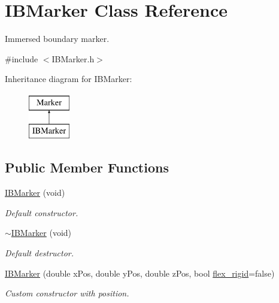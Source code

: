 \hypertarget{class_i_b_marker}{}\section{I\+B\+Marker Class Reference}
\label{class_i_b_marker}


Immersed boundary marker.  




{\ttfamily \#include $<$I\+B\+Marker.\+h$>$}

Inheritance diagram for I\+B\+Marker\+:\begin{figure}[H]
\begin{center}
\leavevmode
\includegraphics[height=2.000000cm]{class_i_b_marker}
\end{center}
\end{figure}
\subsection*{Public Member Functions}
\begin{DoxyCompactItemize}
\item 
\hyperlink{class_i_b_marker_ab45e9679ae96b75ab7655e738807bb41}{I\+B\+Marker} (void)
\begin{DoxyCompactList}\small\item\em Default constructor. \end{DoxyCompactList}\item 
\hyperlink{class_i_b_marker_a0f3e177c42c3d616a2bbf96c0a9c1099}{$\sim$\+I\+B\+Marker} (void)
\begin{DoxyCompactList}\small\item\em Default destructor. \end{DoxyCompactList}\item 
\hyperlink{class_i_b_marker_ae3a7dc30b6910d1aa405810a2e3956b3}{I\+B\+Marker} (double x\+Pos, double y\+Pos, double z\+Pos, bool \hyperlink{class_i_b_marker_a826fd907814ce9c6e40bcbdbd359ec7e}{flex\+\_\+rigid}=false)
\begin{DoxyCompactList}\small\item\em Custom constructor with position. \end{DoxyCompactList}\end{DoxyCompactItemize}
